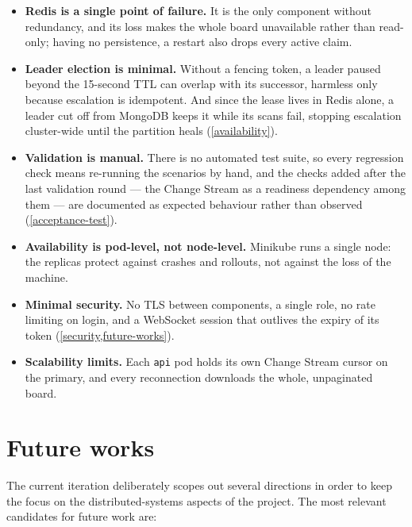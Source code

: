 \documentclass{scrartcl}
\begin{document}
\begin{itemize}
  \item \textbf{Redis is a single point of failure.} It is the only component without redundancy, and its loss makes the whole board unavailable rather than read-only; having no persistence, a restart also drops every active claim.
  \item \textbf{Leader election is minimal.} Without a fencing token, a leader paused beyond the 15-second TTL can overlap with its successor, harmless only because escalation is idempotent. And since the lease lives in Redis alone, a leader cut off from MongoDB keeps it while its scans fail, stopping escalation cluster-wide until the partition heals (\cref{availability}).
  \item \textbf{Validation is manual.} There is no automated test suite, so every regression check means re-running the scenarios by hand, and the checks added after the last validation round --- the Change Stream as a readiness dependency among them --- are documented as expected behaviour rather than observed (\cref{acceptance-test}).
  \item \textbf{Availability is pod-level, not node-level.} Minikube runs a single node: the replicas protect against crashes and rollouts, not against the loss of the machine.
  \item \textbf{Minimal security.} No TLS between components, a single role, no rate limiting on login, and a WebSocket session that outlives the expiry of its token (\cref{security,future-works}).
  \item \textbf{Scalability limits.} Each \texttt{api} pod holds its own Change Stream cursor on the primary, and every reconnection downloads the whole, unpaginated board.
\end{itemize}

\section{Future works}\label{future-works}

The current iteration deliberately scopes out several directions in order to keep the focus on the
distributed-systems aspects of the project. The most relevant candidates for future work are:
\end{document}
